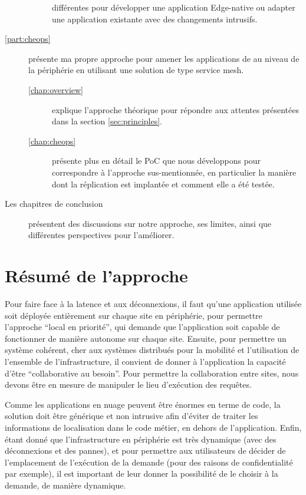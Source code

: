 \begin{description}
\begin{description}
    différentes pour développer une application Edge-native ou adapter
    une application existante avec des changements intrusifs.
  \end{description}
\item [\autoref{part:cheops}] présente ma propre approche pour amener
  les applications de au niveau de la périphérie en utilisant une
  solution de type service mesh.
  \begin{description}
  \item[\autoref{chap:overview}] explique l'approche théorique pour
    répondre aux attentes présentées dans la section \ref{sec:principles}.
  \item[\autoref{chap:cheops}] présente plus en détail le PoC que nous
    développons pour correspondre à l'approche sus-mentionnée, en
    particulier la manière dont la réplication est implantée et
    comment elle a été testée.
\end{description}
\item [Les chapitres de conclusion] présentent des discussions sur
  notre approche, ses limites, ainsi que différentes perspectives pour
  l'améliorer.
\end{description}



\section*{Résumé de l'approche}


Pour faire face à la latence et aux déconnexions, il faut qu'une
application utilisée soit déployée entièrement sur chaque site en
périphérie, pour permettre l'approche ``local en priorité'', qui demande
que l'application soit capable de fonctionner de manière autonome sur
chaque site.
%
Ensuite, pour permettre un système cohérent, cher aux systèmes
distribués pour la mobilité et l'utilisation de l'ensemble de
l'infrastructure, il convient de donner à l'application la capacité
d'être ``collaborative au besoin''.
%
Pour permettre la collaboration entre sites, nous devons être en
mesure de manipuler le lieu d'exécution des requêtes.

Comme les applications en nuage peuvent être énormes en terme de code,
la solution doit être générique et non intrusive afin d'éviter de
traiter les informations de localisation dans le code métier, en
dehors de l'application.
%
Enfin, étant donné que l'infrastructure en périphérie est très
dynamique (avec des déconnexions et des pannes), et pour permettre aux
utilisateurs de décider de l'emplacement de l'exécution de la demande
(pour des raisons de confidentialité par exemple), il est important de
leur donner la possibilité de le choisir à la demande, de manière
dynamique.


